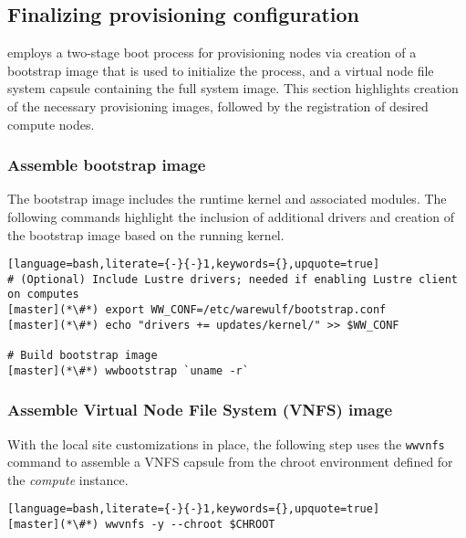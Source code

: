 \subsection{Finalizing provisioning configuration} \label{sec:assemble_bootstrap}

\Warewulf{} employs a two-stage boot process for provisioning nodes via
creation of a bootstrap image that is used to initialize the process, and a virtual node
file system capsule containing the full system image. This section highlights
creation of the necessary provisioning images, followed by the registration of
desired compute nodes.

\subsubsection{Assemble bootstrap image}

The bootstrap image includes the runtime kernel and associated modules. The
following commands highlight the inclusion of additional drivers and creation
of the bootstrap image based on the running kernel.

\begin{lstlisting}[language=bash,literate={-}{-}1,keywords={},upquote=true]
# (Optional) Include Lustre drivers; needed if enabling Lustre client on computes
[master](*\#*) export WW_CONF=/etc/warewulf/bootstrap.conf
[master](*\#*) echo "drivers += updates/kernel/" >> $WW_CONF

# Build bootstrap image
[master](*\#*) wwbootstrap `uname -r`
\end{lstlisting}

\subsubsection{Assemble Virtual Node File System (VNFS) image}

With the local site customizations in place, the following step uses the
\texttt{wwvnfs} command to assemble a VNFS capsule from the chroot environment
defined for the {\em compute} instance. 

\begin{lstlisting}[language=bash,literate={-}{-}1,keywords={},upquote=true]
[master](*\#*) wwvnfs -y --chroot $CHROOT
\end{lstlisting}

